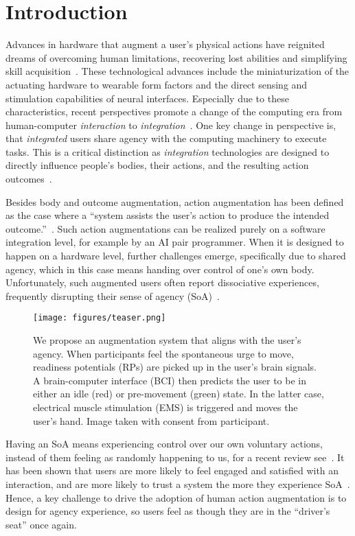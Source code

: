 \section{Introduction}

Advances in hardware that augment a user's physical actions have reignited dreams of overcoming human limitations, recovering lost abilities and simplifying skill acquisition~\citep{Goto2020-mw, Kunze2017-co}. These technological advances include the miniaturization of the actuating hardware to wearable form factors and the direct sensing and stimulation capabilities of neural interfaces. Especially due to these characteristics, recent perspectives promote a change of the computing era from human-computer \textit{interaction} to \textit{integration}~\cite{Mueller2020-dl}. One key change in perspective is, that \textit{integrated} users share agency with the computing machinery to execute tasks. This is a critical distinction as \textit{integration} technologies are designed to directly influence people’s bodies, their actions, and the resulting action outcomes~\cite{Cornelio2022-aq}.

Besides body and outcome augmentation, action augmentation has been defined as the case where a ``system assists the user’s action to produce the intended outcome.''~\cite{Cornelio2022-aq}. Such action augmentations can be realized purely on a software integration level, for example by an AI pair programmer. When it is designed to happen on a hardware level, further challenges emerge, specifically due to shared agency, which in this case means handing over control of one's own body. Unfortunately, such augmented users often report dissociative experiences, frequently disrupting their sense of agency (SoA)~\citep{Gilbert2017-ze, Gilbert2019-uc}.

\begin{figure}[!h]
    \centering
    \texttt{[image: figures/teaser.png]}%
    \caption{We propose an augmentation system that aligns with the user's agency. When participants feel the spontaneous urge to move, readiness potentials (RPs) are picked up in the user's brain signals. A brain-computer interface (BCI) then predicts the user to be in either an idle (red) or pre-movement (green) state. In the latter case, electrical muscle stimulation (EMS) is triggered and moves the user's hand. Image taken with consent from participant.}
    \label{fig:teaser}
\end{figure}

Having an SoA means experiencing control over our own voluntary actions, instead of them feeling as randomly happening to us, for a recent review see~\cite{Wen2022-bm}. It has been shown that users are more likely to feel engaged and satisfied with an interaction, and are more likely to trust a system the more they experience SoA~\citep{Berberian2012-do, Miller2007-rb}. Hence, a key challenge to drive the adoption of human action augmentation is to design for agency experience, so users feel as though they are in the ``driver's seat'' once again.

